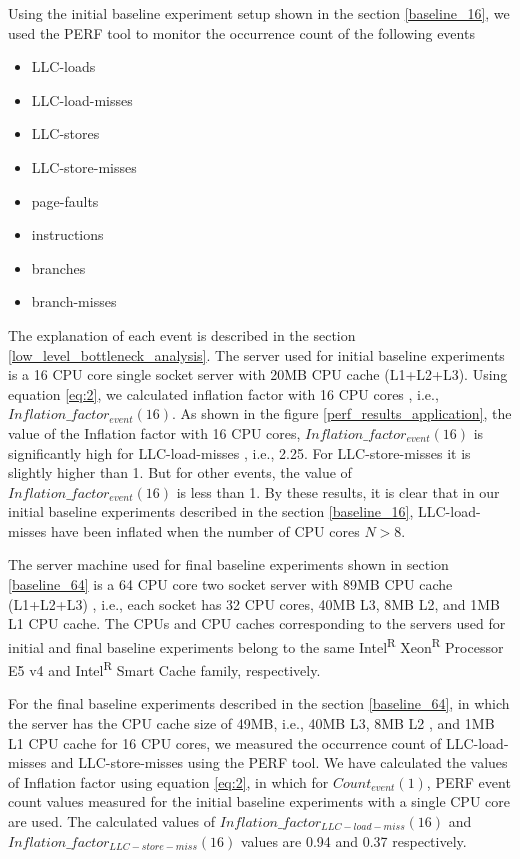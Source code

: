 \documentclass{iitbreport}
\begin{document}
Using the initial baseline experiment setup shown in the section \ref{baseline_16}, we used the PERF tool to monitor the occurrence count of the following events
\begin{itemize}
\item {LLC-loads}
 \item {LLC-load-misses}
\item {LLC-stores}
\item {LLC-store-misses}
\item {page-faults}
\item {instructions}
\item {branches}
\item {branch-misses}
\end{itemize}
The explanation of each event is described in the section \ref{low_level_bottleneck_analysis}. The server used for initial baseline experiments is a 16 CPU core single socket server with 20MB CPU cache (L1+L2+L3). Using equation \ref{eq:2}, we calculated inflation factor with 16 CPU cores , i.e., $Inflation\_factor_{event}(16)$. As shown in the figure \ref{perf_results_application}, the value of the  Inflation factor with 16 CPU cores, $Inflation\_factor_{event}(16)$ is significantly high for LLC-load-misses , i.e., 2.25. For LLC-store-misses it is slightly higher than 1. But  for other  events, the value of $Inflation\_factor_{event}(16)$ is less than 1. By these results, it is clear that  in our initial baseline experiments described in the section \ref{baseline_16}, LLC-load-misses have been inflated when the number of CPU cores $N>8$.

 The server machine used for final baseline experiments shown in section \ref{baseline_64} is a 64 CPU core two socket server with 89MB CPU cache (L1+L2+L3) , i.e., each socket has 32 CPU cores, 40MB L3, 8MB L2, and 1MB L1 CPU cache. The CPUs and CPU caches corresponding to the  servers used for initial and final baseline experiments belong to the same Intel\textsuperscript{R} Xeon\textsuperscript{R} Processor E5 v4  and  Intel\textsuperscript{R}  Smart Cache family, respectively.
 
For the final baseline experiments described in the section \ref{baseline_64}, in which the server has the CPU cache size of 49MB, i.e., 40MB L3, 8MB L2 , and 1MB L1 CPU cache for 16 CPU cores, we measured the occurrence count of LLC-load-misses and LLC-store-misses using the PERF tool. We have calculated the values of Inflation factor using equation \ref{eq:2}, in which for $Count_{event}(1)$, PERF event count values  measured for the initial baseline experiments with a single CPU core are used. The calculated values of $Inflation\_factor_{LLC-load-miss}(16)$ and  $Inflation\_factor_{LLC-store-miss}(16)$ values are 0.94 and 0.37 respectively. 
\end{document}
